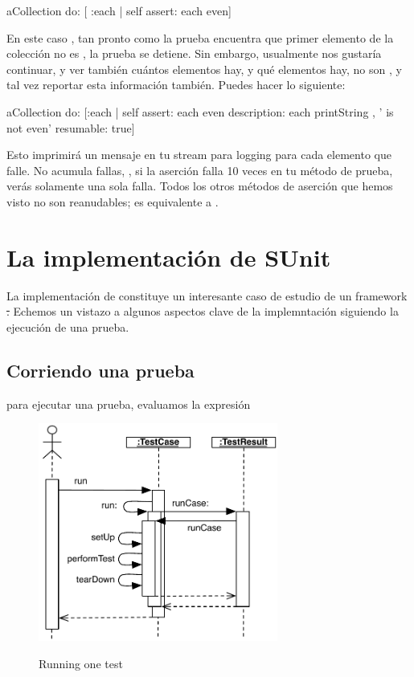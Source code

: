 \documentclass[a4paper,10pt,twoside]{book}
\begin{document}
\begin{code}{}
aCollection do: [ :each | self assert: each even]
\end{code}

En este caso , tan pronto como la prueba encuentra que primer elemento de la colecci\'on no es , la prueba se detiene.
Sin embargo, usualmente nos gustar\'ia continuar, y ver tambi\'en cu\'antos elementos hay, y qu\'e elementos hay,
no son , y tal vez reportar esta informaci\'on tambi\'en. Puedes hacer lo siguiente:

\begin{code}{}
aCollection do:
	[:each |
	self
		assert: each even
		description: each printString , ' is not even'
		resumable: true]
\end{code}

Esto imprimir\'a un mensaje en tu stream para logging para cada elemento que falle.
No acumula fallas, \ie, si la aserci\'on falla 10 veces en tu m\'etodo de prueba, ver\'as solamente una sola falla.
Todos los otros m\'etodos de aserci\'on que hemos visto no son reanudables;
 es equivalente a .
\section{La implementaci\'on de SUnit}

La implementaci\'on de \sunit constituye un interesante caso de estudio de un framework \st. 
Echemos un vistazo a algunos aspectos clave de la implemntaci\'on siguiendo la ejecuci\'on de una prueba.

\subsection{Corriendo una prueba}

para ejecutar una prueba, evaluamos la expresi\'on


\begin{figure}[tbh]
  \begin{center}
		{\includegraphics[width=0.7\textwidth]{sunit-scenario}}
	\caption{Running one test}
  \end{center}
\end{figure}
\end{document}
